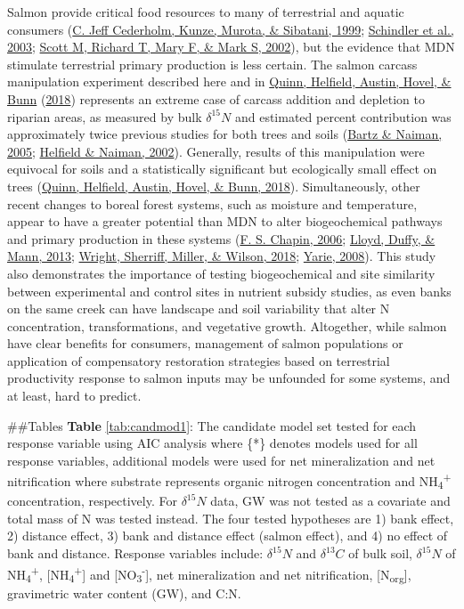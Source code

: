 \documentclass [11pt, proquest] {uwthesis}[2015/03/03]
\begin{document}
Salmon provide critical food resources to many of terrestrial and aquatic consumers (\protect\hyperlink{ref-Cederholm1999}{C. Jeff Cederholm, Kunze, Murota, \& Sibatani, 1999}; \protect\hyperlink{ref-Schindler2003}{Schindler et al., 2003}; \protect\hyperlink{ref-Gende2002}{Scott M, Richard T, Mary F, \& Mark S, 2002}), but the evidence that MDN stimulate terrestrial primary production is less certain. The salmon carcass manipulation experiment described here and in \protect\hyperlink{ref-Quinn2018}{Quinn, Helfield, Austin, Hovel, \& Bunn} (\protect\hyperlink{ref-Quinn2018}{2018}) represents an extreme case of carcass addition and depletion to riparian areas, as measured by bulk \(\delta^{15}N\) and estimated percent contribution was approximately twice previous studies for both trees and soils (\protect\hyperlink{ref-Bartz2005}{Bartz \& Naiman, 2005}; \protect\hyperlink{ref-Helfield2002}{Helfield \& Naiman, 2002}). Generally, results of this manipulation were equivocal for soils and a statistically significant but ecologically small effect on trees (\protect\hyperlink{ref-Quinn2018}{Quinn, Helfield, Austin, Hovel, \& Bunn, 2018}). Simultaneously, other recent changes to boreal forest systems, such as moisture and temperature, appear to have a greater potential than MDN to alter biogeochemical pathways and primary production in these systems (\protect\hyperlink{ref-Chapin2006}{F. S. Chapin, 2006}; \protect\hyperlink{ref-Lloyd2013}{Lloyd, Duffy, \& Mann, 2013}; \protect\hyperlink{ref-Wright2018}{Wright, Sherriff, Miller, \& Wilson, 2018}; \protect\hyperlink{ref-Yarie2008}{Yarie, 2008}). This study also demonstrates the importance of testing biogeochemical and site similarity between experimental and control sites in nutrient subsidy studies, as even banks on the same creek can have landscape and soil variability that alter N concentration, transformations, and vegetative growth. Altogether, while salmon have clear benefits for consumers, management of salmon populations or application of compensatory restoration strategies based on terrestrial productivity response to salmon inputs may be unfounded for some systems, and at least, hard to predict.

\#\#Tables
\textbf{Table} \ref{tab:candmod1}: The candidate model set tested for each response variable using AIC analysis where \{*\} denotes models used for all response variables, additional models were used for net mineralization and net nitrification where substrate represents organic nitrogen concentration and NH\textsubscript{4}\textsuperscript{+} concentration, respectively. For \(\delta^{15}N\) data, GW was not tested as a covariate and total mass of N was tested instead. The four tested hypotheses are 1) bank effect, 2) distance effect, 3) bank and distance effect (salmon effect), and 4) no effect of bank and distance. Response variables include: \(\delta^{15}N\) and \(\delta^{13}C\) of bulk soil, \(\delta^{15}N\) of NH\textsubscript{4}\textsuperscript{+}, {[}NH\textsubscript{4}\textsuperscript{+}{]} and {[}NO\textsubscript{3}\textsuperscript{-}{]}, net mineralization and net nitrification, {[}N\textsubscript{org}{]}, gravimetric water content (GW), and C:N.
\end{document}
